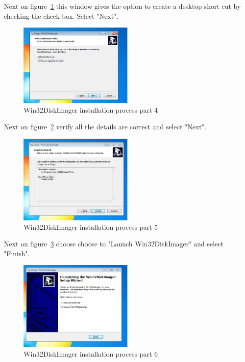 \documentclass[12pt,]{article}
\begin{document}
Next on figure~\ref{fig:4} this window gives the option to create a desktop short cut by checking the check box. Select "Next".
\begin{figure}[H]
  	\begin{center}
    	\includegraphics[width=0.5\textwidth]{Win32_4}
  	\end{center}
  	\caption{Win32DiskImager installation process part 4}
	\label{fig:4}
\end{figure}
Next on figure~\ref{fig:5} verify all the details are correct and select "Next".
\begin{figure}[H]
  	\begin{center}
    	\includegraphics[width=0.5\textwidth]{Win32_5}
  	\end{center}
  	\caption{Win32DiskImager installation process part 5}
	\label{fig:5}
\end{figure}
Next on figure~\ref{fig:6} choose choose to "Launch Win32DiskImager" and select "Finish".
\begin{figure}[H]
  	\begin{center}
    	\includegraphics[width=0.5\textwidth]{Win32_6}
  	\end{center}
  	\caption{Win32DiskImager installation process part 6}
	\label{fig:6}
\end{figure}
\end{document}
